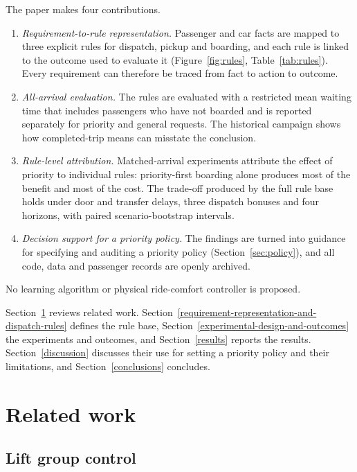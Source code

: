 The paper makes four contributions.
\begin{enumerate}
\item \emph{Requirement-to-rule representation.} Passenger and car facts are mapped to three explicit rules for dispatch, pickup and boarding, and each rule is linked to the outcome used to evaluate it (Figure~\ref{fig:rules}, Table~\ref{tab:rules}). Every requirement can therefore be traced from fact to action to outcome.
\item \emph{All-arrival evaluation.} The rules are evaluated with a restricted mean waiting time that includes passengers who have not boarded and is reported separately for priority and general requests. The historical campaign shows how completed-trip means can misstate the conclusion.
\item \emph{Rule-level attribution.} Matched-arrival experiments attribute the effect of priority to individual rules: priority-first boarding alone produces most of the benefit and most of the cost. The trade-off produced by the full rule base holds under door and transfer delays, three dispatch bonuses and four horizons, with paired scenario-bootstrap intervals.
\item \emph{Decision support for a priority policy.} The findings are turned into guidance for specifying and auditing a priority policy (Section~\ref{sec:policy}), and all code, data and passenger records are openly archived.
\end{enumerate}
No learning algorithm or physical ride-comfort controller is proposed.

Section~\ref{related-work} reviews related work. Section~\ref{requirement-representation-and-dispatch-rules} defines the rule base, Section~\ref{experimental-design-and-outcomes} the experiments and outcomes, and Section~\ref{results} reports the results. Section~\ref{discussion} discusses their use for setting a priority policy and their limitations, and Section~\ref{conclusions} concludes.

\section{Related work}\label{related-work}

\subsection{Lift group control}\label{lift-group-control-and-passenger-information}

